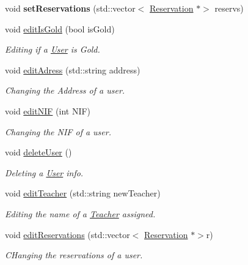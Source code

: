 \begin{DoxyCompactItemize}
\mbox{\label{class_user_a69d12edf2fb136601b7b9558f1c7b1e2}} 
void {\bfseries set\+Reservations} (std\+::vector$<$ \mbox{\hyperlink{class_reservation}{Reservation}} $\ast$$>$ reservs)
\item 
void \mbox{\hyperlink{class_user_a092c80f086767a8c204320b6517bfc58}{edit\+Is\+Gold}} (bool is\+Gold)
\begin{DoxyCompactList}\small\item\em Editing if a \mbox{\hyperlink{class_user}{User}} is Gold. \end{DoxyCompactList}\item 
void \mbox{\hyperlink{class_user_a9d826d552e81ecc17828be848e02519b}{edit\+Adress}} (std\+::string address)
\begin{DoxyCompactList}\small\item\em Changing the Address of a user. \end{DoxyCompactList}\item 
void \mbox{\hyperlink{class_user_a470738d77c8d53ab5c41cdcd74497a82}{edit\+N\+IF}} (int N\+IF)
\begin{DoxyCompactList}\small\item\em Changing the N\+IF of a user. \end{DoxyCompactList}\item 
\mbox{\label{class_user_ab29f666469897568a6c592869cc0a4f9}} 
void \mbox{\hyperlink{class_user_ab29f666469897568a6c592869cc0a4f9}{delete\+User}} ()
\begin{DoxyCompactList}\small\item\em Deleting a \mbox{\hyperlink{class_user}{User}} info. \end{DoxyCompactList}\item 
void \mbox{\hyperlink{class_user_a3161559f3e7b4c29b8a60a51f3d002ad}{edit\+Teacher}} (std\+::string new\+Teacher)
\begin{DoxyCompactList}\small\item\em Editing the name of a \mbox{\hyperlink{class_teacher}{Teacher}} assigned. \end{DoxyCompactList}\item 
void \mbox{\hyperlink{class_user_a0f8f72211ae7a56e413ad70358f96a19}{edit\+Reservations}} (std\+::vector$<$ \mbox{\hyperlink{class_reservation}{Reservation}} $\ast$$>$r)
\begin{DoxyCompactList}\small\item\em C\+Hanging the reservations of a user. \end{DoxyCompactList}\end{DoxyCompactItemize}
